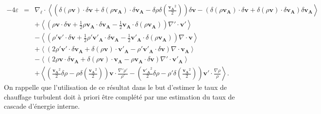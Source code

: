 \begin{eqnarray}
\label{eq:turb_elisop_f2}-4\varepsilon &=& \nabla_{\boldsymbol{\ell}} \cdot \left<\left(\delta \left(\rho\boldsymbol{v}\right) \cdot \delta \boldsymbol{v}+ \delta \left(\rho\boldsymbol{v_A}\right) \cdot \delta \boldsymbol{v_A} - \delta \rho  \delta \left(\frac{\boldsymbol{v_A}^2}{2}\right)\right) \delta \boldsymbol{v}  -\left(\delta \left(\rho\boldsymbol{v_A}\right) \cdot \delta \boldsymbol{v}  + \delta \left(\rho\boldsymbol{v}\right) \cdot \delta \boldsymbol{v_A}  \right) \delta \boldsymbol{v_A} \right> \nonumber\\
&& +\left< \left(\rho \boldsymbol{v} \cdot \delta \boldsymbol{v} +\frac{1}{2} \rho \boldsymbol{v_A} \cdot \delta \boldsymbol{v_A} -\frac{1}{2} \boldsymbol{v_A} \cdot \delta \left(\rho \boldsymbol{v_A}\right) \right) \nabla' \cdot \boldsymbol{v'} \right>\nonumber\\
&& -\left< \left(\rho' \boldsymbol{v'} \cdot \delta \boldsymbol{v} +\frac{1}{2} \rho' \boldsymbol{v'_A} \cdot \delta \boldsymbol{v_A} -\frac{1}{2} \boldsymbol{v'_A} \cdot \delta \left(\rho \boldsymbol{v_A}\right)  \right)\nabla \cdot \boldsymbol{v}\right>\nonumber\\
&&+ \left<\left(2 \rho' \boldsymbol{v'} \cdot \delta \boldsymbol{v_A}+ \delta\left(\rho \boldsymbol{v}\right) \cdot \boldsymbol{v'_A} - \rho' \boldsymbol{v'_A} \cdot \delta \boldsymbol{v}  \right)\nabla \cdot \boldsymbol{v_A}\right>\nonumber\\
&&- \left<\left(2\rho \boldsymbol{v} \cdot \delta \boldsymbol{v_A} + \delta\left(\rho \boldsymbol{v}\right) \cdot \boldsymbol{v_A} - \rho \boldsymbol{v_A} \cdot \delta \boldsymbol{v}  \right)\nabla' \cdot \boldsymbol{v'_A}\right>\nonumber \\
&&+  \left< \left(\frac{\boldsymbol{v_A}^2}{2} \delta \rho - \rho \delta \left(\frac{\boldsymbol{v_A}^2}{2}\right)  \right)\boldsymbol{v} \cdot \frac{\nabla' \rho'}{\rho'}- \left(\frac{\boldsymbol{v'_A}^2}{2} \delta \rho - \rho' \delta \left(\frac{\boldsymbol{v_A}^2}{2} \right)  \right)  \boldsymbol{v'} \cdot \frac{\nabla \rho}{\rho} \right> .
\end{eqnarray} 
On rappelle que l'utilisation de ce résultat dans le but d'estimer le taux de chauffage turbulent doit à priori être complété par une estimation du taux de cascade d'énergie interne.

